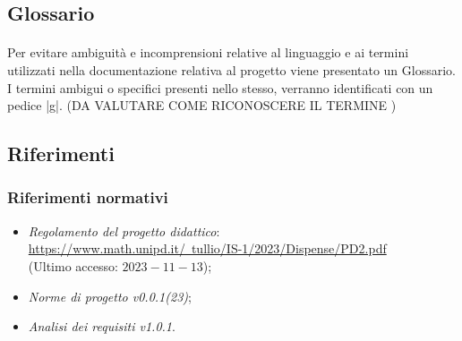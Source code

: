 \documentclass[10pt, a4paper]{article}
\begin{document}

\subsection{Glossario}
\paragraph{}Per evitare ambiguità e incomprensioni relative al linguaggio e ai termini utilizzati nella documentazione relativa al progetto viene presentato un Glossario. I termini ambigui o specifici presenti nello stesso, verranno identificati con un pedice |g|. (DA VALUTARE COME RICONOSCERE IL TERMINE )
\subsection{Riferimenti}

\subsubsection{Riferimenti normativi} 
\begin{itemize}
\item \textit{Regolamento del progetto didattico}: \\
\href{https://www.math.unipd.it/~tullio/IS-1/2023/Dispense/PD2.pdf}{https://www.math.unipd.it/~tullio/IS-1/2023/Dispense/PD2.pdf}\\
(Ultimo accesso: $2023-11-13$);
\item \textit{Norme di progetto v0.0.1(23)};
\item \textit{Analisi dei requisiti v1.0.1}.
\end{itemize}

\end{document}
